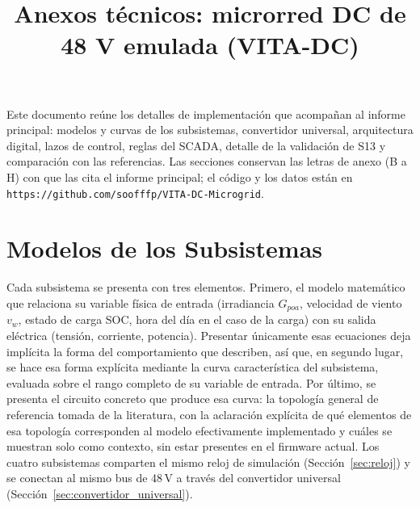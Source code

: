 \documentclass[conference]{IEEEtran}
\begin{document}
\title{Anexos técnicos: microrred DC de 48 V emulada (VITA-DC)\\
}

\author{
\and
{}
}

\maketitle

Este documento reúne los detalles de implementación que acompañan al informe principal: modelos y curvas de los subsistemas, convertidor universal, arquitectura digital, lazos de control, reglas del SCADA, detalle de la validación de S13 y comparación con las referencias. Las secciones conservan las letras de anexo (B a H) con que las cita el informe principal; el código y los datos están en \texttt{https://github.com/soofffp/VITA-DC-Microgrid}.

\appendices
\setcounter{section}{1}

\section{Modelos de los Subsistemas}
\label{app:modelos}
\label{sec:subsistemas}
\label{sec:caracterizacion}
\label{sec:circuitos}

Cada subsistema se presenta con tres elementos. Primero, el modelo matemático que relaciona su variable física de entrada (irradiancia $G_{poa}$, velocidad de viento $v_w$, estado de carga SOC, hora del día en el caso de la carga) con su salida eléctrica (tensión, corriente, potencia). Presentar únicamente esas ecuaciones deja implícita la forma del comportamiento que describen, así que, en segundo lugar, se hace esa forma explícita mediante la curva característica del subsistema, evaluada sobre el rango completo de su variable de entrada. Por último, se presenta el circuito concreto que produce esa curva: la topología general de referencia tomada de la literatura, con la aclaración explícita de qué elementos de esa topología corresponden al modelo efectivamente implementado y cuáles se muestran solo como contexto, sin estar presentes en el firmware actual. Los cuatro subsistemas comparten el mismo reloj de simulación (Sección~\ref{sec:reloj}) y se conectan al mismo bus de 48\,V a través del convertidor universal (Sección~\ref{sec:convertidor_universal}).
\end{document}
